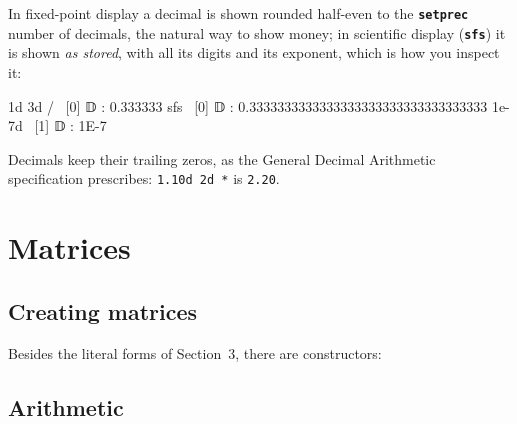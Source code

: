 \documentclass[11pt,letterpaper]{article}
\newcommand{\code}[1]{\texttt{#1}}
\newcommand{\cmd}[1]{\texttt{\textbf{#1}}}
\begin{document}
In fixed-point display a decimal is shown rounded half-even to the \cmd{setprec} number of decimals, the natural way to show money; in scientific display (\cmd{sfs}) it is shown \emph{as stored}, with all its digits and its exponent, which is how you inspect it:
\begin{rpn}
1d 3d /                \ [0] 𝔻 : 0.333333
sfs                    \ [0] 𝔻 : 0.3333333333333333333333333333333333
1e-7d                  \ [1] 𝔻 : 1E-7
\end{rpn}
Decimals keep their trailing zeros, as the General Decimal Arithmetic specification prescribes: \code{1.10d 2d *} is \code{2.20}.

\section{Matrices}
\label{sec:matrices}

\subsection{Creating matrices}

Besides the literal forms of Section~3, there are constructors:

\subsection{Arithmetic}
\end{document}
